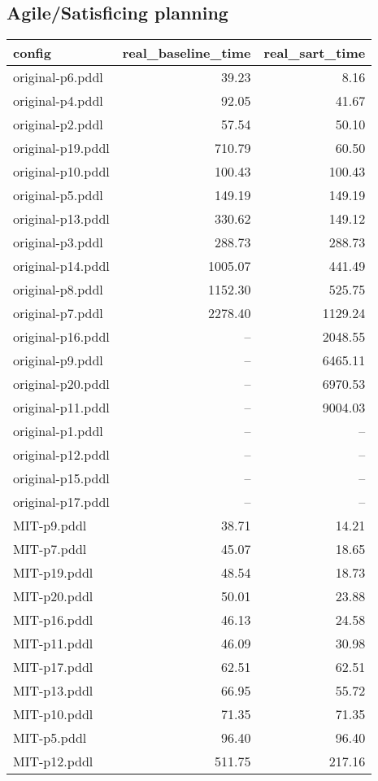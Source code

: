 \documentclass{article}
\begin{document}
                    \subsection*{Agile/Satisficing planning}
                    
                            \begin{center}
                            \scriptsize
                            \begin{tabular}{@{}l|r|r@{}}
                            config & real\_baseline\_time & real\_sart\_time\\\midrule
                             original-p6.pddl&39.23&8.16\\
 original-p4.pddl&92.05&41.67\\
 original-p2.pddl&57.54&50.10\\
 original-p19.pddl&710.79&60.50\\
 original-p10.pddl&100.43&100.43\\
 original-p5.pddl&149.19&149.19\\
 original-p13.pddl&330.62&149.12\\
 original-p3.pddl&288.73&288.73\\
 original-p14.pddl&1005.07&441.49\\
 original-p8.pddl&1152.30&525.75\\
 original-p7.pddl&2278.40&1129.24\\
 original-p16.pddl&--&2048.55\\
 original-p9.pddl&--&6465.11\\
 original-p20.pddl&--&6970.53\\
 original-p11.pddl&--&9004.03\\
 original-p1.pddl&--&--\\
 original-p12.pddl&--&--\\
 original-p15.pddl&--&--\\
 original-p17.pddl&--&--\\
 MIT-p9.pddl&38.71&14.21\\
 MIT-p7.pddl&45.07&18.65\\
 MIT-p19.pddl&48.54&18.73\\
 MIT-p20.pddl&50.01&23.88\\
 MIT-p16.pddl&46.13&24.58\\
 MIT-p11.pddl&46.09&30.98\\
 MIT-p17.pddl&62.51&62.51\\
 MIT-p13.pddl&66.95&55.72\\
 MIT-p10.pddl&71.35&71.35\\
 MIT-p5.pddl&96.40&96.40\\
 MIT-p12.pddl&511.75&217.16
                            \end{tabular}
                            \end{center}
                    
\end{document}
